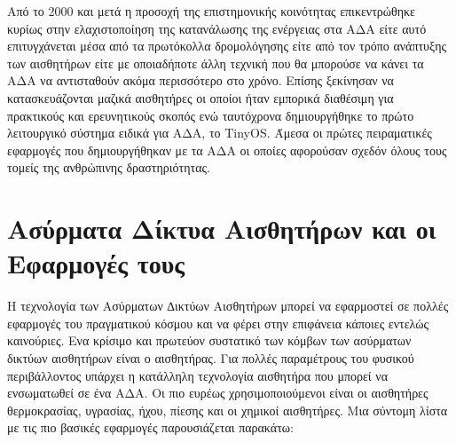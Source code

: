 Από το 2000 και μετά η προσοχή της επιστημονικής κοινότητας επικεντρώθηκε κυρίως στην ελαχιστοποίηση της κατανάλωσης της ενέργειας στα ΑΔΑ είτε αυτό επιτυγχάνεται
μέσα από τα πρωτόκολλα δρομολόγησης είτε από τον τρόπο ανάπτυξης των αισθητήρων είτε με οποιαδήποτε άλλη τεχνική που θα μπορούσε να κάνει τα ΑΔΑ να αντισταθούν ακόμα
περισσότερο στο χρόνο.
Επίσης ξεκίνησαν να κατασκευάζονται μαζικά αισθητήρες οι οποίοι ήταν εμπορικά διαθέσιμη για πρακτικούς και ερευνητικούς σκοπός ενώ ταυτόχρονα δημιουργήθηκε το πρώτο
λειτουργικό σύστημα ειδικά για ΑΔΑ, το TinyOS.
Άμεσα οι  πρώτες πειραματικές εφαρμογές που δημιουργήθηκαν με τα ΑΔΑ οι οποίες αφορούσαν σχεδόν όλους τους τομείς της ανθρώπινης δραστηριότητας.

\section{Ασύρματα Δίκτυα Αισθητήρων και οι Εφαρμογές τους}
Η τεχνολογία των Ασύρματων ∆ικτύων Αισθητήρων μπορεί να εφαρμοστεί σε πολλές εφαρμογές του πραγματικού κόσμου και να φέρει στην επιφάνεια κάποιες εντελώς καινούριες.
Ενα κρίσιμο και πρωτεύον συστατικό των κόμβων των ασύρματων δικτύων αισθητήρων είναι ο αισθητήρας.
Για πολλές παραμέτρους του φυσικού περιβάλλοντος υπάρχει η κατάλληλη τεχνολογία αισθητήρα που μπορεί να ενσωματωθεί σε ένα ΑΔΑ.
Οι πιο ευρέως χρησιμοποιούμενοι είναι οι αισθητήρες θερμοκρασίας, υγρασίας, ήχου, πίεσης και οι χημικοί αισθητήρες.
Μια σύντομη λίστα με τις πιο βασικές εφαρμογές παρουσιάζεται παρακάτω:
